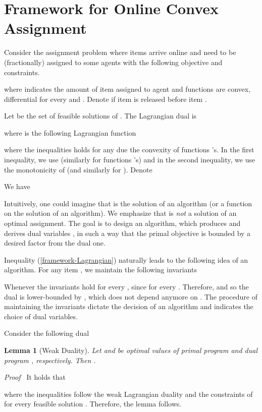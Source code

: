 \documentclass[11pt]{article}
\newenvironment{proof}{\noindent\emph{Proof\ }}{\hspace*{\fill}\medskip}
\newtheorem{lemma}{Lemma}
\begin{document}
\section{Framework for Online Convex Assignment}		\label{sec:framework}
  
Consider the assignment problem where items  arrive online 
and need to be (fractionally) assigned to some agents  with the following objective and constraints.   

where  indicates the amount of item  assigned to agent  
and functions  are convex, differential for every  and 
. Denote  if item  is released before item . 

Let  be the set of feasible solutions of . 
The Lagrangian dual is
 
where  is the following Lagrangian function 

where the inequalities holds for any  due the convexity of functions 's.
In the first inequality, we use  
(similarly for functions 's) and in the second inequality, 
we use the monotonicity of  (and similarly for ).
Denote 

We have 

Intuitively, one could imagine that  is the solution of an algorithm (or a function 
on the solution of an algorithm). We emphasize that  is \emph{not} a solution of 
an optimal assignment. The goal is to design 
an algorithm, which produces  and derives dual variables , in such
a way that the primal objective is bounded by a desired factor from the dual one.
   
Inequality (\ref{framework-Lagrangian}) naturally leads to the following idea of an algorithm. 
For any item , we maintain the following invariants  

Whenever the invariants hold for every ,
 since  for every . 
Therefore,  and so the dual 
is lower-bounded by , which does not depend anymore
on . The procedure of maintaining the invariants dictate the decision  
of an algorithm and indicates the choice of dual variables. 

Consider the following dual


\begin{lemma}[Weak Duality]
Let  and  be optimal values of primal program
 and dual program , respectively. Then
.
\end{lemma}
\begin{proof}
It holds that

where the inequalities follow the weak Lagrangian duality and the constraints of 
for every feasible solution .
Therefore, the lemma follows.
\end{proof}
\end{document}
